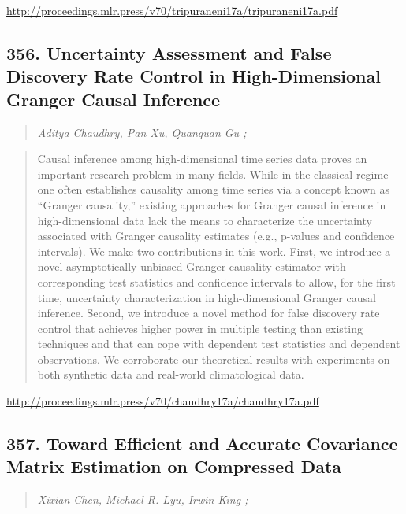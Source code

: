 \documentclass{article}
\begin{document}
\href{http://proceedings.mlr.press/v70/tripuraneni17a/tripuraneni17a.pdf}{http://proceedings.mlr.press/v70/tripuraneni17a/tripuraneni17a.pdf}

\subsection{356. Uncertainty Assessment and False Discovery Rate Control in High-Dimensional Granger Causal Inference}

\begin{quote}
\footnotesize{\textit{Aditya Chaudhry, Pan Xu, Quanquan Gu ;}}

\end{quote}

\begin{quote}
    Causal inference among high-dimensional time series data proves an important research problem in many fields. While in the classical regime one often establishes causality among time series via a concept known as “Granger causality,” existing approaches for Granger causal inference in high-dimensional data lack the means to characterize the uncertainty associated with Granger causality estimates (e.g., p-values and confidence intervals). We make two contributions in this work. First, we introduce a novel asymptotically unbiased Granger causality estimator with corresponding test statistics and confidence intervals to allow, for the first time, uncertainty characterization in high-dimensional Granger causal inference. Second, we introduce a novel method for false discovery rate control that achieves higher power in multiple testing than existing techniques and that can cope with dependent test statistics and dependent observations. We corroborate our theoretical results with experiments on both synthetic data and real-world climatological data.  
\end{quote}

\href{http://proceedings.mlr.press/v70/chaudhry17a/chaudhry17a.pdf}{http://proceedings.mlr.press/v70/chaudhry17a/chaudhry17a.pdf}

\subsection{357. Toward Efficient and Accurate Covariance Matrix Estimation on Compressed Data}

\begin{quote}
\footnotesize{\textit{Xixian Chen, Michael R. Lyu, Irwin King ;}}

\end{quote}
\end{document}
